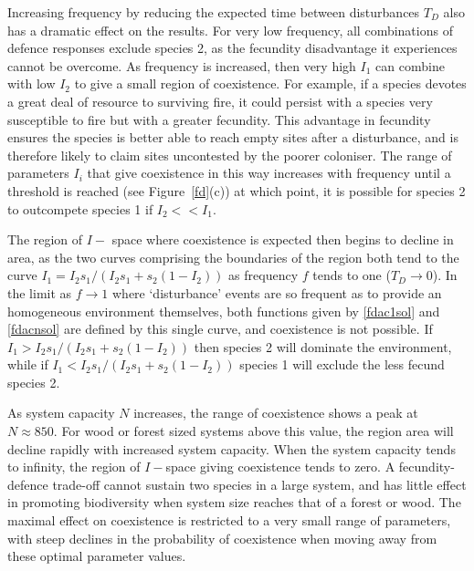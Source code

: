 Increasing frequency by reducing the expected time between disturbances $T_D$ also has a dramatic effect on the results. For very low frequency, all combinations of defence responses exclude species 2, as the fecundity disadvantage it experiences cannot be overcome. As frequency is increased, then very high $I_1$ can combine with low $I_2$ to give a small region of coexistence. For example, if a species devotes a great deal of resource to surviving fire, it could persist with a species very susceptible to fire but with a greater fecundity. This advantage in fecundity ensures the species is better able to reach empty sites after a disturbance, and is therefore likely to claim sites uncontested by the poorer coloniser. The range of parameters $I_i$ that give coexistence in this way increases with frequency until a threshold is reached (see Figure~\ref{fd}(c)) at which point, it is possible for species 2 to outcompete species 1 if $I_2<<I_1$.

The region of $I-$ space where coexistence is expected then begins to decline in area, as the two curves comprising the boundaries of the region both tend to the curve $I_1=I_2s_1/(I_2s_1+s_2(1-I_2))$ as frequency $f$ tends to one ($T_D \to 0$). In the limit as $f \to 1$ where `disturbance' events are so frequent as to provide an homogeneous environment themselves, both functions given by \eqref{fdac1sol} and \eqref{fdacnsol} are defined by this single curve, and coexistence is not possible. If $I_1>I_2s_1/(I_2s_1+s_2(1-I_2))$ then species 2 will dominate the environment, while if $I_1<I_2s_1/(I_2s_1+s_2(1-I_2))$ species 1 will exclude the less fecund species 2.

As system capacity $N$ increases, the range of coexistence shows a peak at $N \approx 850$. For wood or forest sized systems above this value, the region area will decline rapidly with increased system capacity. When the system capacity tends to infinity, the region of $I-$space giving coexistence tends to zero. A fecundity-defence trade-off cannot sustain two species in a large system, and has little effect in promoting biodiversity when system size reaches that of a forest or wood. The maximal effect on coexistence is restricted to a very small range of parameters, with steep declines in the probability of coexistence when moving away from these optimal parameter values. 


